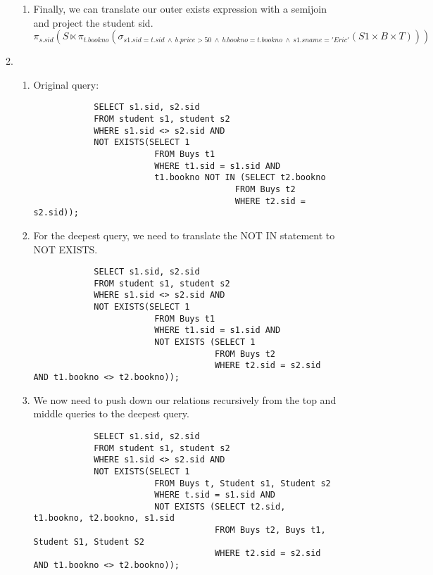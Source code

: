 \documentclass{article}
\begin{document}
\begin{enumerate}
\begin{enumerate}
\begin{enumerate}
            \item Finally, we can translate our outer exists expression with a semijoin and project the student sid.
            \begin{displaymath}
                \pi_{s.sid}(S \ltimes
                \pi_{t.bookno}(\sigma_{s1.sid=t.sid\ \wedge\ b.price > 50\ \wedge\ b.bookno = t.bookno\ \wedge\ s1.sname='Eric'}(S1 \times B \times T)))
            \end{displaymath}

        \end{enumerate}

        \newpage

        \item %
        \begin{enumerate}

            \item Original query:
            \begin{lstlisting}
            SELECT s1.sid, s2.sid
            FROM student s1, student s2
            WHERE s1.sid <> s2.sid AND
            NOT EXISTS(SELECT 1
                        FROM Buys t1
                        WHERE t1.sid = s1.sid AND
                        t1.bookno NOT IN (SELECT t2.bookno
                                        FROM Buys t2
                                        WHERE t2.sid = s2.sid));
            \end{lstlisting}

            \item For the deepest query, we need to translate the NOT IN statement to NOT EXISTS.
            \begin{lstlisting}
            SELECT s1.sid, s2.sid
            FROM student s1, student s2
            WHERE s1.sid <> s2.sid AND
            NOT EXISTS(SELECT 1
                        FROM Buys t1
                        WHERE t1.sid = s1.sid AND
                        NOT EXISTS (SELECT 1
                                    FROM Buys t2
                                    WHERE t2.sid = s2.sid AND t1.bookno <> t2.bookno));
            \end{lstlisting}

            \item We now need to push down our relations recursively from the top and middle queries to the deepest query.
            \begin{lstlisting}
            SELECT s1.sid, s2.sid
            FROM student s1, student s2
            WHERE s1.sid <> s2.sid AND
            NOT EXISTS(SELECT 1
                        FROM Buys t, Student s1, Student s2
                        WHERE t.sid = s1.sid AND
                        NOT EXISTS (SELECT t2.sid, t1.bookno, t2.bookno, s1.sid
                                    FROM Buys t2, Buys t1, Student S1, Student S2
                                    WHERE t2.sid = s2.sid AND t1.bookno <> t2.bookno));
            \end{lstlisting}


\end{enumerate}
\end{enumerate}
\end{enumerate}
\end{document}
